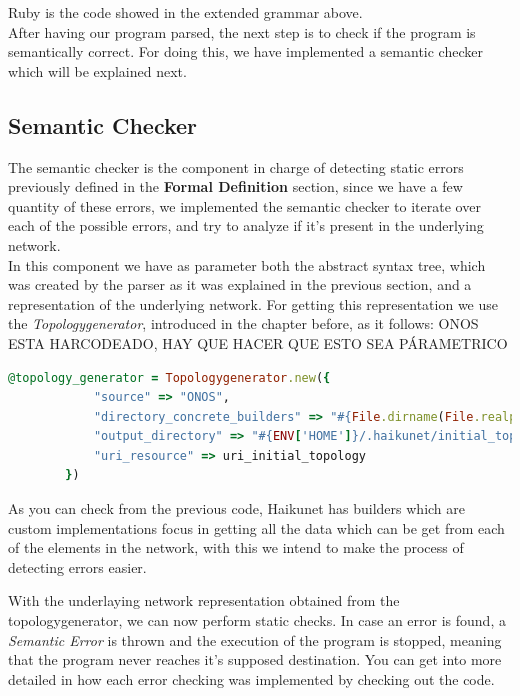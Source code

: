 Ruby is the code showed in the extended grammar above.\\
After having our program parsed, the next step is to check if the program is semantically correct. For doing this, we have implemented a semantic checker which will be explained next. 

\subsection{Semantic Checker}

The semantic checker is the component in charge of detecting static errors previously defined in the \textbf{Formal Definition} section, since we have a few quantity of these errors, we implemented the semantic checker to iterate over each of the possible errors, and try to analyze if it's present in the underlying network.\\
In this component we have as parameter both the abstract syntax tree, which was created by the parser as it was explained in the previous section, and a representation of the underlying network. For getting this representation we use the \textit{Topologygenerator}, introduced in the chapter before, as it follows: ONOS ESTA HARCODEADO, HAY QUE HACER QUE ESTO SEA PÁRAMETRICO

\begin{lstlisting}[language=Ruby,breaklines=true]
@topology_generator = Topologygenerator.new({
            "source" => "ONOS",
            "directory_concrete_builders" => "#{File.dirname(File.realpath(__FILE__))}/haikunet_builders/initial_topology_builders",
            "output_directory" => "#{ENV['HOME']}/.haikunet/initial_topology/#{@file_name}",
            "uri_resource" => uri_initial_topology 
        })
\end{lstlisting}

As you can check from the previous code, Haikunet has builders which are custom implementations focus in getting all the data which can be get from each of the elements in the network, with this we intend to make the process of detecting errors easier.

With the underlaying network representation obtained from the topologygenerator, we can now perform static checks. In case an error is found, a \textit{Semantic Error} is thrown and the execution of the program is stopped, meaning that the program never reaches it's supposed destination. You can get into more detailed in how each error checking was implemented by checking out the code. 

